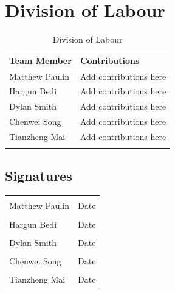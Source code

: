 \documentclass[]{article}
\begin{document}
	
	\newpage
	\appendix
	\section{Division of Labour}
	\label{sec:division_of_labour}
	
	
	\begin{longtable}{| p{} | p{} |}
		\hline
		\textbf {Team Member} & \textbf{Contributions}\\ 
		\hline
		Matthew Paulin &  Add contributions here\\
		\hline
		Hargun Bedi & Add contributions here\\
		\hline
		Dylan Smith & Add contributions here \\ 
		\hline
		Chenwei Song & Add contributions here\\
		\hline
		Tianzheng Mai & Add contributions here\\
		\hline
		
		\caption{Division of Labour}
	\end{longtable}
	\subsection{Signatures}
	\vspace{10ex}
	\begin{center}
		\noindent\begin{tabular}{ll}\\ 
			\makebox[3.5in]{\hrulefill} & \makebox[2in]	\hrulefill \\
			Matthew Paulin & Date\\[15ex]
			\makebox[3.5in]{\hrulefill} & \makebox[2in]	\hrulefill \\		
			Hargun Bedi & Date\\[15ex]
			\makebox[3.5in]{\hrulefill} & \makebox[2in]	\hrulefill \\		
			Dylan Smith & Date\\[15ex]
			\makebox[3.5in]{\hrulefill} & \makebox[2in]	\hrulefill \\		
			Chenwei Song & Date\\[15ex]
			\makebox[3.5in]{\hrulefill} & \makebox[2in]	\hrulefill \\
			Tianzheng Mai & Date\\
		\end{tabular}
	\end{center}
	
\end{document}
